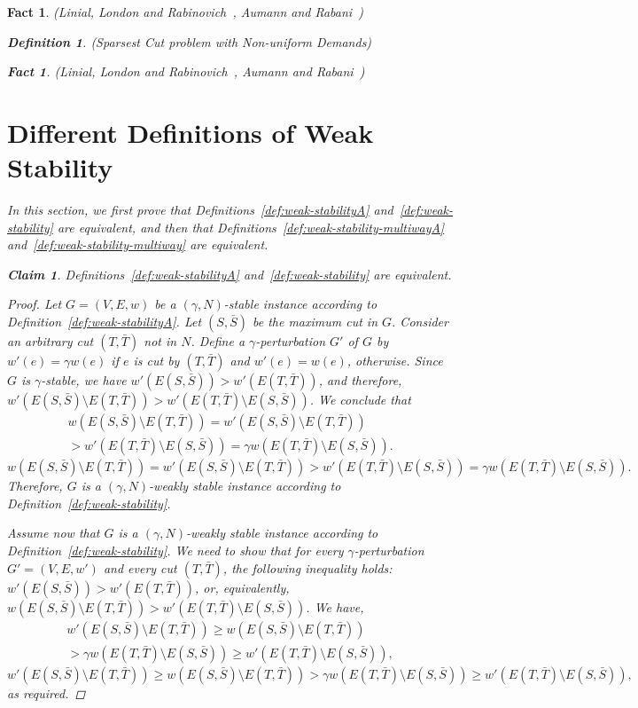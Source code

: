 \documentclass[twoside,leqno,twocolumn]{article}
\newtheorem{Definition}[theorem]{Definition}
\newtheorem{fact}[theorem]{Fact}
\newtheorem{claim}{Claim}[section]
\begin{document}
\begin{fact}{\sc (Linial, London and Rabinovich~\cite{LLR}, Aumann and Rabani~\cite{AR})}
\begin{Definition} {\sc (Sparsest Cut problem with Non-uniform Demands)}
\begin{fact}{\sc (Linial, London and Rabinovich~\cite{LLR}, Aumann and Rabani~\cite{AR})}
\section{Different Definitions of Weak Stability} \label{apx:equivalence}
In this section, we first prove that Definitions~\ref{def:weak-stabilityA} and~\ref{def:weak-stability} are equivalent,
and then that Definitions~\ref{def:weak-stability-multiwayA} and~\ref{def:weak-stability-multiway} are equivalent.
\begin{claim}Definitions~\ref{def:weak-stabilityA} and~\ref{def:weak-stability} are equivalent.
\end{claim}
\begin{proof}
Let $G=(V,E,w)$ be a $(\gamma,N)$-stable instance according to Definition~\ref{def:weak-stabilityA}. 
Let $(S,\bar S)$ be the maximum cut in $G$. Consider an arbitrary
cut $(T, \bar T)$ not in $N$. Define a $\gamma$-perturbation $G'$ of $G$ by
$w'(e) = \gamma w(e)$ if $e$ is cut by $(T,\bar T)$ and $w'(e) = w(e)$, otherwise.
Since $G$ is $\gamma$-stable, we have $w'(E(S,\bar S)) > w'(E(T,\bar T))$, and therefore,
$w'(E(S,\bar S)\setminus E(T,\bar T)) > w'(E(T,\bar T)\setminus E(S,\bar S))$. We conclude that
\ifSODA
\begin{multline*}
w(E(S,\bar S)\setminus E(T,\bar T)) = w'(E(S,\bar S)\setminus E(T,\bar T)) \\ > w'(E(T,\bar T)\setminus E(S,\bar S)) = \gamma w(E(T,\bar T)\setminus E(S,\bar S)).
\end{multline*}
\else
$$
w(E(S,\bar S)\setminus E(T,\bar T)) = w'(E(S,\bar S)\setminus E(T,\bar T)) > w'(E(T,\bar T)\setminus E(S,\bar S)) = \gamma w(E(T,\bar T)\setminus E(S,\bar S)).
$$
\fi
Therefore, $G$ is a $(\gamma, N)$-weakly stable instance according to Definition~\ref{def:weak-stability}.

Assume now that $G$ is a $(\gamma, N)$-weakly stable instance according to Definition~\ref{def:weak-stability}.
We need to show that for every $\gamma$-perturbation $G' = (V,E,w')$ and every cut $(T,\bar T)$, the following inequality holds:  $w'(E(S,\bar S)) > w'(E(T,\bar T))$, or, equivalently,
$w(E(S,\bar S)\setminus E(T,\bar T)) > w'(E(T,\bar T)\setminus E(S,\bar S))$.
We have,
\ifSODA
\begin{multline*}
w'(E(S,\bar S)\setminus E(T,\bar T)) \geq w(E(S,\bar S)\setminus E(T,\bar T)) \\ > \gamma w(E(T,\bar T)\setminus E(S,\bar S))
\geq w'(E(T,\bar T)\setminus E(S,\bar S)),
\end{multline*}
\else
$$
w'(E(S,\bar S)\setminus E(T,\bar T)) \geq w(E(S,\bar S)\setminus E(T,\bar T)) > \gamma w(E(T,\bar T)\setminus E(S,\bar S))
\geq w'(E(T,\bar T)\setminus E(S,\bar S)),
$$
\fi
as required.
\end{proof}


\end{fact}
\end{Definition}
\end{fact}
\end{document}
